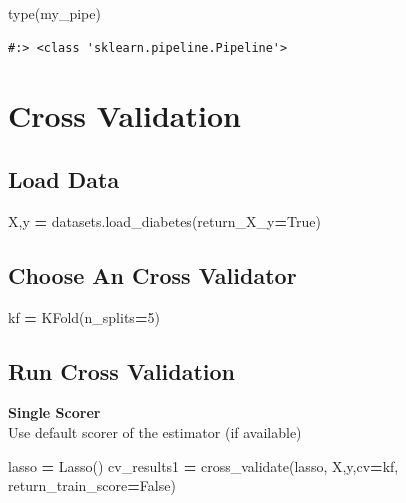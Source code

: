 \documentclass[
]{book}
\newenvironment{Shaded}{\begin{snugshade}}{\end{snugshade}}
\newcommand{\BuiltInTok}[1]{#1}
\newcommand{\DecValTok}[1]{\textcolor[rgb]{0.06,0.06,0.06}{#1}}
\newcommand{\NormalTok}[1]{#1}
\newcommand{\OperatorTok}[1]{\textcolor[rgb]{0.43,0.43,0.43}{\textbf{#1}}}
\newcommand{\VariableTok}[1]{\textcolor[rgb]{0,0,0}{#1}}
\begin{document}
\begin{Shaded}
\begin{Highlighting}[]
\BuiltInTok{type}\NormalTok{(my_pipe)}
\end{Highlighting}
\end{Shaded}

\begin{verbatim}
#:> <class 'sklearn.pipeline.Pipeline'>
\end{verbatim}

\hypertarget{cross-validation}{%
\section{Cross Validation}\label{cross-validation}}

\hypertarget{load-data}{%
\subsection{Load Data}\label{load-data}}

\begin{Shaded}
\begin{Highlighting}[]
\NormalTok{X,y }\OperatorTok{=}\NormalTok{ datasets.load_diabetes(return_X_y}\OperatorTok{=}\VariableTok{True}\NormalTok{)}
\end{Highlighting}
\end{Shaded}

\hypertarget{choose-an-cross-validator}{%
\subsection{Choose An Cross Validator}\label{choose-an-cross-validator}}

\begin{Shaded}
\begin{Highlighting}[]
\NormalTok{kf }\OperatorTok{=}\NormalTok{ KFold(n_splits}\OperatorTok{=}\DecValTok{5}\NormalTok{)}
\end{Highlighting}
\end{Shaded}

\hypertarget{run-cross-validation}{%
\subsection{Run Cross Validation}\label{run-cross-validation}}

\textbf{Single Scorer}\\
Use default scorer of the estimator (if available)

\begin{Shaded}
\begin{Highlighting}[]
\NormalTok{lasso }\OperatorTok{=}\NormalTok{ Lasso()}
\NormalTok{cv_results1 }\OperatorTok{=}\NormalTok{ cross_validate(lasso, X,y,cv}\OperatorTok{=}\NormalTok{kf,}
\NormalTok{    return_train_score}\OperatorTok{=}\VariableTok{False}\NormalTok{)}
\end{Highlighting}
\end{Shaded}
\end{document}
